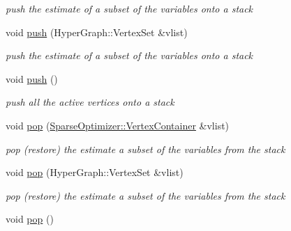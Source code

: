 \begin{DoxyCompactItemize}
\begin{DoxyCompactList}\small\item\em push the estimate of a subset of the variables onto a stack \end{DoxyCompactList}\item 
\hypertarget{classg2o_1_1SparseOptimizer_ac9a5fd64764e61d99e8a90734118a8bf}{void \hyperlink{classg2o_1_1SparseOptimizer_ac9a5fd64764e61d99e8a90734118a8bf}{push} (Hyper\-Graph\-::\-Vertex\-Set \&vlist)}\label{classg2o_1_1SparseOptimizer_ac9a5fd64764e61d99e8a90734118a8bf}

\begin{DoxyCompactList}\small\item\em push the estimate of a subset of the variables onto a stack \end{DoxyCompactList}\item 
\hypertarget{classg2o_1_1SparseOptimizer_a4c121d69052291775860d06507aba698}{void \hyperlink{classg2o_1_1SparseOptimizer_a4c121d69052291775860d06507aba698}{push} ()}\label{classg2o_1_1SparseOptimizer_a4c121d69052291775860d06507aba698}

\begin{DoxyCompactList}\small\item\em push all the active vertices onto a stack \end{DoxyCompactList}\item 
\hypertarget{classg2o_1_1SparseOptimizer_a57dbbb584122c6cfa292bb79d8fcd7ad}{void \hyperlink{classg2o_1_1SparseOptimizer_a57dbbb584122c6cfa292bb79d8fcd7ad}{pop} (\hyperlink{structg2o_1_1OptimizableGraph_a54f01b9b6071e65e6abeebe4afb29dec}{Sparse\-Optimizer\-::\-Vertex\-Container} \&vlist)}\label{classg2o_1_1SparseOptimizer_a57dbbb584122c6cfa292bb79d8fcd7ad}

\begin{DoxyCompactList}\small\item\em pop (restore) the estimate a subset of the variables from the stack \end{DoxyCompactList}\item 
\hypertarget{classg2o_1_1SparseOptimizer_aa6688f8636bf89ef919d72947692d59c}{void \hyperlink{classg2o_1_1SparseOptimizer_aa6688f8636bf89ef919d72947692d59c}{pop} (Hyper\-Graph\-::\-Vertex\-Set \&vlist)}\label{classg2o_1_1SparseOptimizer_aa6688f8636bf89ef919d72947692d59c}

\begin{DoxyCompactList}\small\item\em pop (restore) the estimate a subset of the variables from the stack \end{DoxyCompactList}\item 
\hypertarget{classg2o_1_1SparseOptimizer_ad2f7f62ebe17b40e050f0525db64355b}{void \hyperlink{classg2o_1_1SparseOptimizer_ad2f7f62ebe17b40e050f0525db64355b}{pop} ()}\label{classg2o_1_1SparseOptimizer_ad2f7f62ebe17b40e050f0525db64355b}


\end{DoxyCompactItemize}
